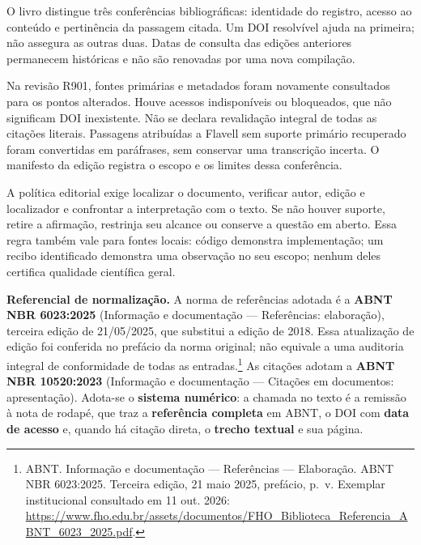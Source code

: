\begin{resultado}
O livro distingue três conferências bibliográficas: identidade do registro,
acesso ao conteúdo e pertinência da passagem citada. Um DOI resolvível ajuda na
primeira; não assegura as outras duas. Datas de consulta das edições anteriores
permanecem históricas e não são renovadas por uma nova compilação.

Na revisão R901, fontes primárias e metadados foram novamente consultados para
os pontos alterados. Houve acessos indisponíveis ou bloqueados, que não significam
DOI inexistente. Não se declara revalidação integral de todas as citações literais.
Passagens atribuídas a Flavell sem suporte primário recuperado foram convertidas
em paráfrases, sem conservar uma transcrição incerta. O manifesto da edição
registra o escopo e os limites dessa conferência.

A política editorial exige localizar o documento, verificar autor, edição e
localizador e confrontar a interpretação com o texto. Se não houver suporte,
retire a afirmação, restrinja seu alcance ou conserve a questão em aberto. Essa
regra também vale para fontes locais: código demonstra implementação; um recibo
identificado demonstra uma observação no seu escopo; nenhum deles certifica
qualidade científica geral.

\textbf{Referencial de normalização.} A norma de referências adotada é a
\textbf{ABNT NBR 6023:2025} (Informação e documentação --- Referências:
elaboração), terceira edição de 21/05/2025, que substitui a edição de 2018.
Essa atualização de edição foi conferida no prefácio da norma original;
não equivale a uma auditoria integral de conformidade de todas as entradas.\footnote{ABNT. Informação e documentação — Referências — Elaboração.
ABNT NBR 6023:2025. Terceira edição, 21 maio 2025, prefácio, p.~v.
Exemplar institucional consultado em 11 out. 2026:
\url{https://www.fho.edu.br/assets/documentos/FHO_Biblioteca_Referencia_ABNT_6023_2025.pdf}.}
As citações adotam a \textbf{ABNT NBR 10520:2023} (Informação e
documentação --- Citações em documentos: apresentação). Adota-se o
\textbf{sistema numérico}: a chamada no texto é a remissão à nota de rodapé, que
traz a \textbf{referência completa} em ABNT, o DOI com \textbf{data de acesso}
e, quando há citação direta, o \textbf{trecho textual} e sua página.
\end{resultado}

